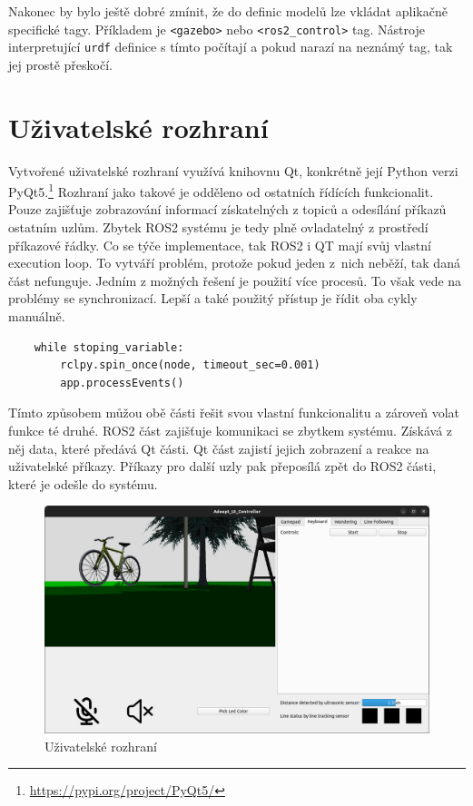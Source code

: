 Nakonec by bylo ještě dobré zmínit, že do definic modelů lze vkládat aplikačně specifické tagy. Příkladem je \verb|<gazebo>| nebo \verb|<ros2_control>| tag. Nástroje interpretující \verb|urdf| definice s tímto počítají a pokud narazí na neznámý tag, tak jej prostě přeskočí.

\newpage
\section{Uživatelské rozhraní}
Vytvořené uživatelské rozhraní využívá knihovnu Qt, konkrétně její Python verzi PyQt5.\footnote{\url{https://pypi.org/project/PyQt5/}} Rozhraní jako takové je odděleno od ostatních řídících funkcionalit. Pouze zajišťuje zobrazování informací získatelných z topiců a odesílání příkazů ostatním uzlům. Zbytek ROS2 systému je tedy plně ovladatelný z prostředí příkazové řádky. Co se týče implementace, tak ROS2 i QT mají svůj vlastní execution loop. To vytváří problém, protože pokud jeden z~nich neběží, tak daná část nefunguje. Jedním z možných řešení je použití více procesů. To však vede na problémy se synchronizací. Lepší a také použitý přístup je řídit oba cykly manuálně. 
\begin{verbatim}
	while stoping_variable:
	    rclpy.spin_once(node, timeout_sec=0.001)
	    app.processEvents()
\end{verbatim}
Tímto způsobem můžou obě části řešit svou vlastní funkcionalitu a zároveň volat funkce té druhé. ROS2 část zajišťuje komunikaci se zbytkem systému. Získává z něj data, které předává Qt části. Qt část zajistí jejich zobrazení a reakce na uživatelské příkazy. Příkazy pro další uzly pak přeposílá zpět do ROS2 části, které je odešle do systému.

\begin{figure}[h!]
	\centering
	\includegraphics[scale=0.3]{obrazky-figures/ui.png}
	\caption{Uživatelské rozhraní}
	\label{fig:ui}
\end{figure}

